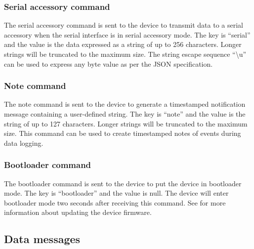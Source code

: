 

\subsubsection{Serial accessory command}

The serial accessory command is sent to the device to transmit data to a serial accessory when the serial interface is in serial accessory mode.  The key is \enquote{serial} and the value is the data expressed as a string of up to 256 characters.  Longer strings will be truncated to the maximum size.  The string escape sequence \enquote{\textbackslash u} can be used to express any byte value as per the \ac{JSON} specification.


\subsubsection{Note command}

The note command is sent to the device to generate a timestamped notification message containing a user-defined string.  The key is \enquote{note} and the value is the string of up to 127 characters.  Longer strings will be truncated to the maximum size.  This command can be used to create timestamped notes of events during data logging.


\subsubsection{Bootloader command}

The bootloader command is sent to the device to put the device in bootloader mode.  The key is \enquote{bootloader} and the value is null.  The device will enter bootloader mode two seconds after receiving this command.  See  for more information about updating the device firmware.


\subsection{Data messages}
\label{sec:dataMessages}


